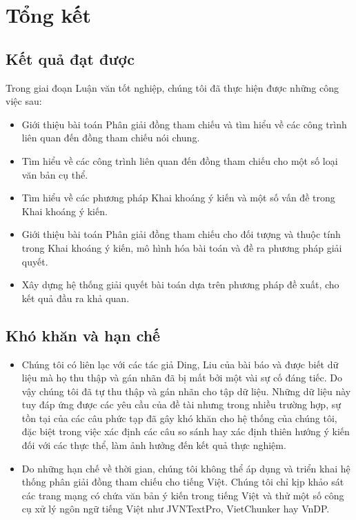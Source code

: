 \documentclass[12pt]{report}
\begin{document}
	\chapter{Tổng kết}	
		\section*{Kết quả đạt được}		
		\par Trong giai đoạn Luận văn tốt nghiệp, chúng tôi đã thực hiện được những công việc sau:
		\begin{itemize}
			\item{Giới thiệu bài toán Phân giải đồng tham chiếu và tìm hiểu về các công trình liên quan đến đồng tham chiếu nói chung.}
			\item{Tìm hiểu về các công trình liên quan đến đồng tham chiếu cho một số loại văn bản cụ thể.}
			\item{Tìm hiểu về các phương pháp Khai khoáng ý kiến và một số vấn đề trong Khai khoáng ý kiến.}
			\item{Giới thiệu bài toán Phân giải đồng tham chiếu cho đối tượng và thuộc tính trong Khai khoáng ý kiến, mô hình hóa bài toán và đề ra phương pháp giải quyết.}
			\item{Xây dựng hệ thống giải quyết bài toán dựa trên phương pháp đề xuất, cho kết quả đầu ra khả quan.}
		\end{itemize}
		\section*{Khó khăn và hạn chế}		
			\begin{itemize}
				\item{Chúng tôi có liên lạc với các tác giả Ding, Liu của bài báo \cite{mainpaper} và được biết dữ liệu mà họ thu thập và gán nhãn đã bị mất bởi một vài sự cố đáng tiếc. Do vậy chúng tôi đã tự thu thập và gán nhãn cho tập dữ liệu. Những dữ liệu này tuy đáp ứng được các yêu cầu của đề tài nhưng trong nhiều trường hợp, sự tồn tại của các câu phức tạp đã gây khó khăn cho hệ thống của chúng tôi, đặc biệt trong việc xác định các câu so sánh hay xác định thiên hướng ý kiến đối với các thực thể, làm ảnh hưởng đến kết quả thực nghiệm.}
				\item{Do những hạn chế về thời gian, chúng tôi không thể áp dụng và triển khai hệ thống phân giải đồng tham chiếu cho tiếng Việt. Chúng tôi chỉ kịp khảo sát các trang mạng có chứa văn bản ý kiến trong tiếng Việt và thử một số công cụ xử lý ngôn ngữ tiếng Việt như JVNTextPro, VietChunker hay VnDP.}
			\end{itemize}	
\end{document}
